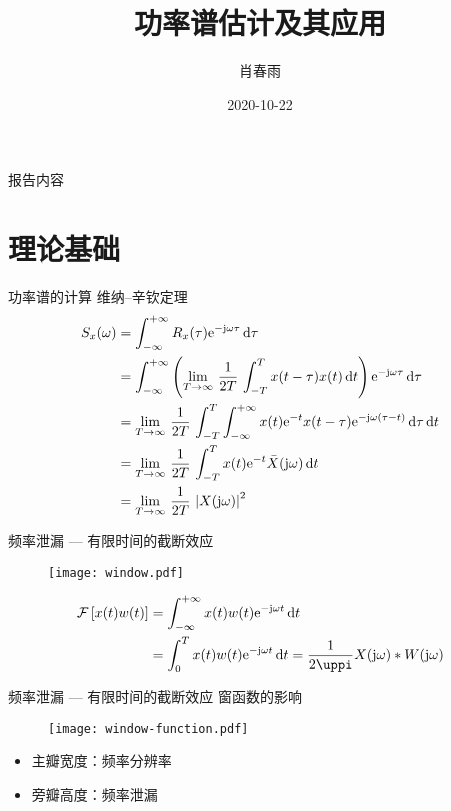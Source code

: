 \documentclass{beamer}
\title{功率谱估计及其应用}
\date{2020-10-22}
\author{肖春雨}
\institute{华中科技大学}
\begin{document}
\maketitle

\begin{frame}{报告内容}
    \tableofcontents
\end{frame}

\section{理论基础}
\begin{frame}{功率谱的计算}
    维纳--辛钦定理
    \begin{align*}
        S_x(\omega) &= \int_{-\infty}^{+\infty} R_x(\tau) \mathrm{e}^{-\mathrm{j}\omega\tau} \mathop{}\!\mathrm{d} \tau \\
        &= \int_{-\infty}^{+\infty} \left( \lim_{T \to \infty} \, \frac{1}{2T} \, \int_{-T}^{T} x(t-\tau)x(t) \mathop{}\!\mathrm{d} t   \right) \mathrm{e}^{-\mathrm{j}\omega\tau} \mathop{}\!\mathrm{d} \tau  \\
        &= \lim_{T \to \infty} \, \frac{1}{2T} \, \int_{-T}^{T} \int_{-\infty}^{+\infty} x(t)\mathrm{e}^{-t} x(t-\tau)\mathrm{e}^{-\mathrm{j}\omega(\tau-t)} \mathop{}\!\mathrm{d} \tau \mathop{}\!\mathrm{d} t \\
        &= \lim_{T \to \infty} \, \frac{1}{2T} \, \int_{-T}^{T}  x(t)\mathrm{e}^{-t} \bar{X}(\mathrm{j}\omega) \mathop{}\!\mathrm{d} t \\
        &= \lim_{T \to \infty} \, \frac{1}{2T} \, \left| X(\mathrm{j}\omega) \right|^2
    \end{align*}
\end{frame}


\begin{frame}{频率泄漏 --- 有限时间的截断效应}
    \begin{figure}
        \centering
        \texttt{[image: window.pdf]}
    \end{figure}
    \begin{align*}
        \mathcal{F}\left[x(t)w(t)\right] &= \int_{-\infty}^{+\infty} x(t)w(t) \e{-\j\omega t} \dif t \\
        &= \int_{0}^{T} x(t)w(t) \e{-\j\omega t} \dif t 
        = \frac{1}{2\uppi} X(\j\omega) \ast W(\j\omega)
    \end{align*}
\end{frame}

\begin{frame}{频率泄漏 --- 有限时间的截断效应}
    窗函数的影响
    \begin{figure}
        \centering
        \texttt{[image: window-function.pdf]}
    \end{figure}
    \begin{itemize}
        \item 主瓣宽度：频率分辨率
        \item 旁瓣高度：频率泄漏
    \end{itemize}
\end{frame}
\end{document}
